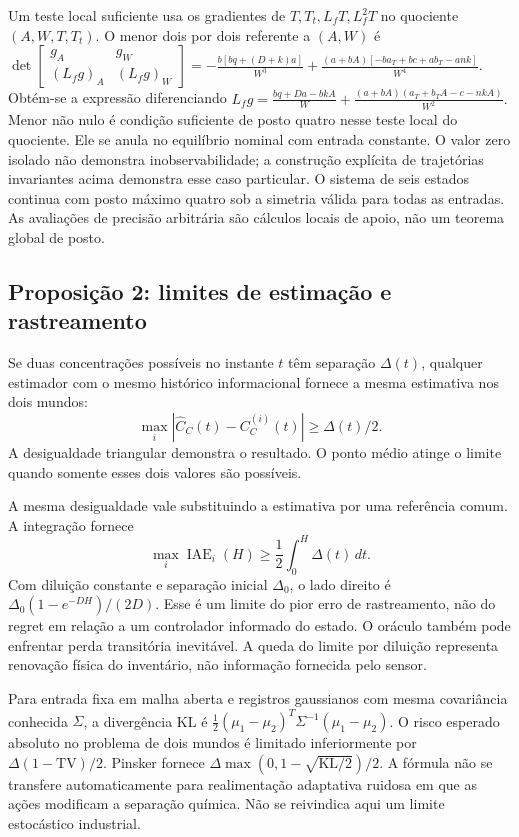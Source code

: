 \documentclass[
  11pt,
]{article}
\begin{document}
Um teste local suficiente usa os gradientes de \(T,T_t,L_fT,L_f^2T\) no
quociente \((A,W,T,T_t)\). O menor dois por dois referente a \((A,W)\) é
\(\det\begin{bmatrix}g_A&g_W\\(L_fg)_A&(L_fg)_W\end{bmatrix} =-\frac{b[bq+(D+k)a]}{W^3} +\frac{(a+bA)[-ba_T+bc+ab_T-ank]}{W^4}.\)
Obtém-se a expressão diferenciando
\(L_fg=\frac{bq+Da-bkA}{W} +\frac{(a+bA)(a_T+b_TA-c-nkA)}{W^2}.\) Menor
não nulo é condição suficiente de posto quatro nesse teste local do
quociente. Ele se anula no equilíbrio nominal com entrada constante. O
valor zero isolado não demonstra inobservabilidade; a construção
explícita de trajetórias invariantes acima demonstra esse caso
particular. O sistema de seis estados continua com posto máximo quatro
sob a simetria válida para todas as entradas. As avaliações de precisão
arbitrária são cálculos locais de apoio, não um teorema global de posto.

\hypertarget{proposiuxe7uxe3o-2-limites-de-estimauxe7uxe3o-e-rastreamento}{%
\subsection{Proposição 2: limites de estimação e
rastreamento}\label{proposiuxe7uxe3o-2-limites-de-estimauxe7uxe3o-e-rastreamento}}

Se duas concentrações possíveis no instante \(t\) têm separação
\(\Delta(t)\), qualquer estimador com o mesmo histórico informacional
fornece a mesma estimativa nos dois mundos:
\[\max_i|\hat C_C(t)-C_C^{(i)}(t)|\geq\Delta(t)/2.\] A desigualdade
triangular demonstra o resultado. O ponto médio atinge o limite quando
somente esses dois valores são possíveis.

A mesma desigualdade vale substituindo a estimativa por uma referência
comum. A integração fornece
\[\max_i\operatorname{IAE}_i(H)\geq\frac12\int_0^H\Delta(t)\,dt.\] Com
diluição constante e separação inicial \(\Delta_0\), o lado direito é
\(\Delta_0(1-e^{-DH})/(2D)\). Esse é um limite do pior erro de
rastreamento, não do regret em relação a um controlador informado do
estado. O oráculo também pode enfrentar perda transitória inevitável. A
queda do limite por diluição representa renovação física do inventário,
não informação fornecida pelo sensor.

Para entrada fixa em malha aberta e registros gaussianos com mesma
covariância conhecida \(\Sigma\), a divergência KL é
\(\frac12(\mu_1-\mu_2)^T\Sigma^{-1}(\mu_1-\mu_2)\). O risco esperado
absoluto no problema de dois mundos é limitado inferiormente por
\(\Delta(1-\mathrm{TV})/2\). Pinsker fornece
\(\Delta\max(0,1-\sqrt{\mathrm{KL}/2})/2\). A fórmula não se transfere
automaticamente para realimentação adaptativa ruidosa em que as ações
modificam a separação química. Não se reivindica aqui um limite
estocástico industrial.
\end{document}

